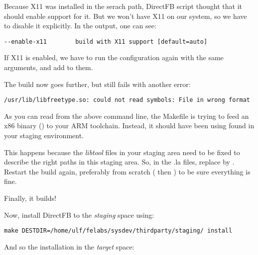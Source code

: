 Because X11 was installed in the serach path, DirectFB 
script thought that it should enable support for it. But we won't have
X11 on our system, so we have to disable it explicitly. In the
 output, one can see:

\begin{verbatim}
--enable-x11		build with X11 support [default=auto]
\end{verbatim}

If X11 is enabled, we have to run the configuration again with the same arguments, and
add  to them.

The build now goes further, but still fails with another error:

\begin{verbatim}
/usr/lib/libfreetype.so: could not read symbols: File in wrong format
\end{verbatim}

As you can read from the above command line, the Makefile is trying to
feed an x86 binary () to your ARM
toolchain. Instead, it should have been using
 found in your staging environment.

This happens because the {\em libtool}  files in your
staging area need to be fixed to describe the right paths in this
staging area. So, in the .la files, replace 
by
. Restart
the build again, preferably from scratch ( then
) to be sure everything is fine.

Finally, it builds!

Now, install DirectFB to the {\em staging} space using:

\begin{verbatim}
make DESTDIR=/home/ulf/felabs/sysdev/thirdparty/staging/ install
\end{verbatim}

And so the installation in the {\em target} space:

